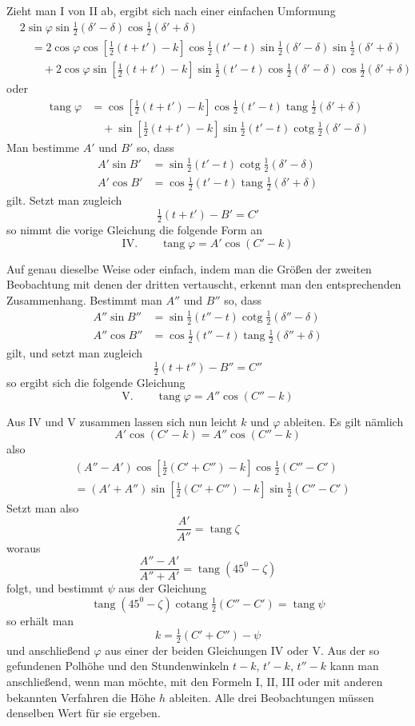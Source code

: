 Zieht man I von II ab, ergibt sich nach einer einfachen Umformung
\[
\begin{aligned}
&2\sin\varphi\sin\tfrac12(\delta'-\delta)\cos\tfrac12(\delta'+\delta)\\
&\quad=2\cos\varphi\cos[\tfrac12(t+t')-k]\cos\tfrac12(t'-t)\sin\tfrac12(\delta'-\delta)\sin\tfrac12(\delta'+\delta)\\
&\qquad+2\cos\varphi\sin[\tfrac12(t+t')-k]\sin\tfrac12(t'-t)\cos\tfrac12(\delta'-\delta)\cos\tfrac12(\delta'+\delta)
\end{aligned}
\]
oder
\[
\begin{aligned}
\operatorname{tang}\varphi&=\cos[\tfrac12(t+t')-k]\cos\tfrac12(t'-t)\operatorname{tang}\tfrac12(\delta'+\delta)\\
&\quad+\sin[\tfrac12(t+t')-k]\sin\tfrac12(t'-t)\operatorname{cotg}\tfrac12(\delta'-\delta)
\end{aligned}
\]
%
Man bestimme $A'$ und $B'$ so, dass
\[
\begin{aligned}
A'\sin B'&=\sin\tfrac12(t'-t)\operatorname{cotg}\tfrac12(\delta'-\delta)\\
A'\cos B'&=\cos\tfrac12(t'-t)\operatorname{tang}\tfrac12(\delta'+\delta)
\end{aligned}
\]
gilt. Setzt man zugleich
\[
\tfrac12(t+t')-B'=C'
\]
so nimmt die vorige Gleichung die folgende Form an
\[
\mathrm{IV.}\qquad\operatorname{tang}\varphi=A'\cos(C'-k)
\]

Auf genau dieselbe Weise oder einfach, indem man die Größen der zweiten Beobachtung mit denen der dritten vertauscht, erkennt man den entsprechenden Zusammenhang. Bestimmt man $A''$ und $B''$ so, dass
\[
\begin{aligned}
A''\sin B''&=\sin\tfrac12(t''-t)\operatorname{cotg}\tfrac12(\delta''-\delta)\\
A''\cos B''&=\cos\tfrac12(t''-t)\operatorname{tang}\tfrac12(\delta''+\delta)
\end{aligned}
\]
gilt, und setzt man zugleich
\[
\tfrac12(t+t'')-B''=C''
\]
so ergibt sich die folgende Gleichung
\[
\mathrm{V.}\qquad\operatorname{tang}\varphi=A''\cos(C''-k)
\]

Aus IV und V zusammen lassen sich nun leicht $k$ und $\varphi$ ableiten. Es gilt nämlich
\[
A'\cos(C'-k)=A''\cos(C''-k)
\]
also
\[
\begin{aligned}
&(A''-A')\cos[\tfrac12(C'+C'')-k]\cos\tfrac12(C''-C')\\
&=(A'+A'')\sin[\tfrac12(C'+C'')-k]\sin\tfrac12(C''-C')
\end{aligned}
\]
Setzt man also
\[
\frac{A'}{A''}=\operatorname{tang}\zeta
\]
woraus
\[
\frac{A''-A'}{A''+A'}=\operatorname{tang}(45^0-\zeta)
\]
%
folgt, und bestimmt $\psi$ aus der Gleichung
\[
\operatorname{tang}(45^0-\zeta)\operatorname{cotang}\tfrac12(C''-C')=\operatorname{tang}\psi
\]
so erhält man
\[
k=\tfrac12(C'+C'')-\psi
\]
und anschließend $\varphi$ aus einer der beiden Gleichungen IV oder V. Aus der so gefundenen Polhöhe und den Stundenwinkeln $t-k$, $t'-k$, $t''-k$ kann man anschließend, wenn man möchte, mit den Formeln I, II, III oder mit anderen bekannten Verfahren die Höhe $h$ ableiten. Alle drei Beobachtungen müssen denselben Wert für sie ergeben.

